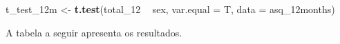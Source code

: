 \documentclass[
]{book}
\newenvironment{Shaded}{\begin{snugshade}}{\end{snugshade}}
\newcommand{\DataTypeTok}[1]{\textcolor[rgb]{0.13,0.29,0.53}{#1}}
\newcommand{\DecValTok}[1]{\textcolor[rgb]{0.00,0.00,0.81}{#1}}
\newcommand{\KeywordTok}[1]{\textcolor[rgb]{0.13,0.29,0.53}{\textbf{#1}}}
\newcommand{\NormalTok}[1]{#1}
\newcommand{\OperatorTok}[1]{\textcolor[rgb]{0.81,0.36,0.00}{\textbf{#1}}}
\newcommand{\OtherTok}[1]{\textcolor[rgb]{0.56,0.35,0.01}{#1}}
\newcommand{\StringTok}[1]{\textcolor[rgb]{0.31,0.60,0.02}{#1}}
\begin{document}
\begin{Shaded}
\begin{Highlighting}[]
\NormalTok{t_test_12m <-}\StringTok{ }\KeywordTok{t.test}\NormalTok{(total_}\DecValTok{12} \OperatorTok{~}\StringTok{ }\NormalTok{sex, }\DataTypeTok{var.equal =}\NormalTok{ T, }\DataTypeTok{data =}\NormalTok{ asq_12months)}
\end{Highlighting}
\end{Shaded}

A tabela a seguir apresenta os resultados.

\begin{Shaded}
\end{Shaded}
\end{document}
